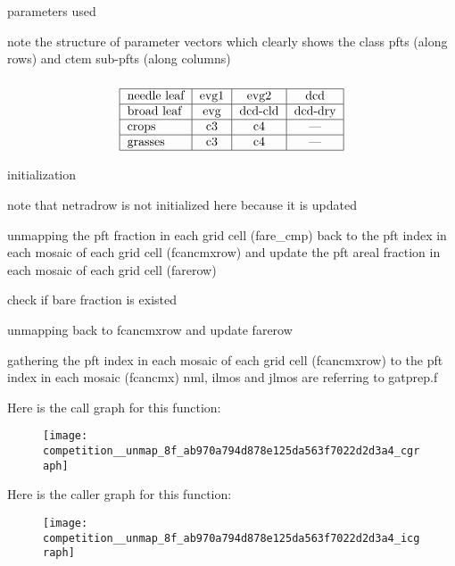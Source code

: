  parameters used

note the structure of parameter vectors which clearly shows the class pfts (along rows) and ctem sub-\/pfts (along columns) \subsubsection*{\[ \begin{tabular} { | l | c | c | c | } \hline needle leaf & evg1 & evg2 & dcd \\ \hline broad leaf & evg & dcd-cld & dcd-dry \\ \hline crops & c3 & c4 & --- \\ \hline grasses & c3 & c4 & --- \\ \hline \end{tabular} \] }

initialization

note that netradrow is not initialized here because it is updated

unmapping the pft fraction in each grid cell (fare\+\_\+cmp) back to the pft index in each mosaic of each grid cell (fcancmxrow) and update the pft areal fraction in each mosaic of each grid cell (farerow)

check if bare fraction is existed

unmapping back to fcancmxrow and update farerow

gathering the pft index in each mosaic of each grid cell (fcancmxrow) to the pft index in each mosaic (fcancmx) nml, ilmos and jlmos are referring to gatprep.\+f

Here is the call graph for this function\+:\nopagebreak
\begin{figure}[H]
\begin{center}
\leavevmode
\texttt{[image: competition\_\_unmap\_8f\_ab970a794d878e125da563f7022d2d3a4\_cgraph]}
\end{center}
\end{figure}




Here is the caller graph for this function\+:\nopagebreak
\begin{figure}[H]
\begin{center}
\leavevmode
\texttt{[image: competition\_\_unmap\_8f\_ab970a794d878e125da563f7022d2d3a4\_icgraph]}
\end{center}
\end{figure}


